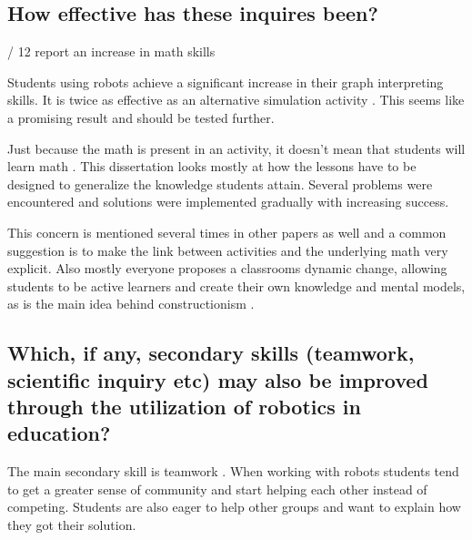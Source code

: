 \subsection{How effective has these inquires been?}

\bigskip{} / 12 report an increase in math skills

\bigskip\noindent
Students using robots achieve a significant increase in their graph interpreting skills. It is twice as effective as an alternative simulation activity . This seems like a promising result and should be tested further. 

\bigskip\noindent
Just because the math is present in an activity, it doesn't mean that students will learn math . This dissertation looks mostly at how the lessons have to be designed to generalize the knowledge students attain. Several problems were encountered and solutions were implemented gradually with increasing success.

\bigskip\noindent
This concern is mentioned several times in other papers as well and a common suggestion is to make the link between activities and the underlying math very explicit. Also mostly everyone proposes a classrooms dynamic change, allowing students to be active learners and create their own knowledge and mental models, as is the main idea behind constructionism \cite{papert1980mindstorms}.

\subsection{Which, if any, secondary skills (teamwork, scientific inquiry etc) may also be improved through the utilization of robotics in education?}

The main secondary skill is teamwork \cite{mitnik2009collaborative, }. When working with robots students tend to get a greater sense of community and start helping each other instead of competing. Students are also eager to help other groups and want to explain how they got their solution.

